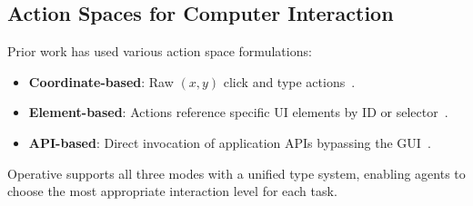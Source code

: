 \subsection{Action Spaces for Computer Interaction}

Prior work has used various action space formulations:

\begin{itemize}[leftmargin=*]
    \item \textbf{Coordinate-based}: Raw $(x, y)$ click and type actions~\cite{anthropic2024computer}.
    \item \textbf{Element-based}: Actions reference specific UI elements by ID or selector~\cite{he2024webvoyager}.
    \item \textbf{API-based}: Direct invocation of application APIs bypassing the GUI~\cite{wang2024mobile}.
\end{itemize}

Operative supports all three modes with a unified type system, enabling agents to choose the most appropriate interaction level for each task.

